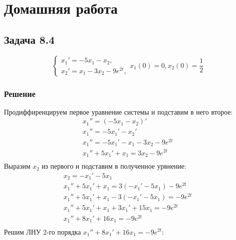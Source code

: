\section{Домашняя работа}

\subsection*{Задача 8.4}
\begin{equation*}
	\begin{cases}
		x_1' = -5x_1 - x_2, \\
		x_2' = x_1 - 3x_2 - 9e^{2t},
	\end{cases}
	x_1(0) = 0, x_2(0) = \frac{1}{2}
\end{equation*}
\subsubsection*{Решение}
Продиффиренцируем первое уравнение системы и подставим в него второе:
\begin{gather*}
	x_1'' = (-5x_1 - x_2)' \\
	x_1'' = -5x_1' - x_2' \\
	x_1'' = -5x_1' - x_1 - 3x_2 - 9e^{2t} \\
	x_1'' + 5x_1' + x_1 = 3x_2 - 9e^{2t} \\
\end{gather*}
Выразим $x_2$ из первого и подставим в полученное урвнение:
\begin{gather*}
	x_2 = -x_1' - 5x_1 \\
	x_1'' + 5x_1' + x_1 = 3(-x_1' - 5x_1) - 9e^{2t} \\
	x_1'' + 5x_1' + x_1 - 3(-x_1' - 5x_1) = - 9e^{2t} \\
	x_1'' + 5x_1' + x_1 + 3x_1' + 15x_1 = - 9e^{2t} \\
	x_1'' + 8x_1' + 16x_1 = - 9e^{2t} \\
\end{gather*}
Решим ЛНУ 2-го порядка $x_1'' + 8x_1' + 16x_1 = - 9e^{2t}$:
